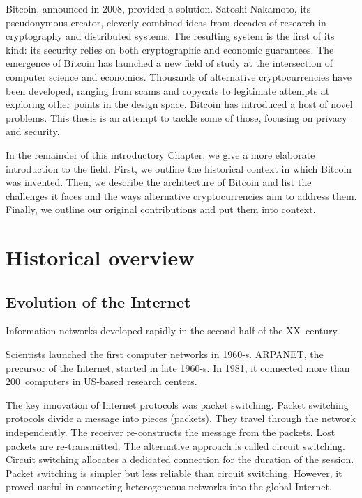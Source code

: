Bitcoin, announced in 2008, provided a solution.
Satoshi Nakamoto, its pseudonymous creator, cleverly combined ideas from decades of research in cryptography and distributed systems.
The resulting system is the first of its kind: its security relies on both cryptographic and economic guarantees.
The emergence of Bitcoin has launched a new field of study at the intersection of computer science and economics.
Thousands of alternative cryptocurrencies have been developed, ranging from scams and copycats to legitimate attempts at exploring other points in the design space.
Bitcoin has introduced a host of novel problems.
This thesis is an attempt to tackle some of those, focusing on privacy and security.

In the remainder of this introductory Chapter, we give a more elaborate introduction to the field.
First, we outline the historical context in which Bitcoin was invented.
Then, we describe the architecture of Bitcoin and list the challenges it faces and the ways alternative cryptocurrencies aim to address them.
Finally, we outline our original contributions and put them into context.


\section{Historical overview}


\subsection{Evolution of the Internet}

Information networks developed rapidly in the second half of the XX~century.

Scientists launched the first computer networks in 1960-s.
ARPANET, the precursor of the Internet, started in late 1960-s.
In 1981, it connected more than $200$~computers in US-based research centers.

The key innovation of Internet protocols was packet switching.
Packet switching protocols divide a message into pieces (packets).
They travel through the network independently.
The receiver re-constructs the message from the packets.
Lost packets are re-transmitted.
The alternative approach is called circuit switching.
Circuit switching allocates a dedicated connection for the duration of the session.
Packet switching is simpler but less reliable than circuit switching.
However, it proved useful in connecting heterogeneous networks into the global Internet.

